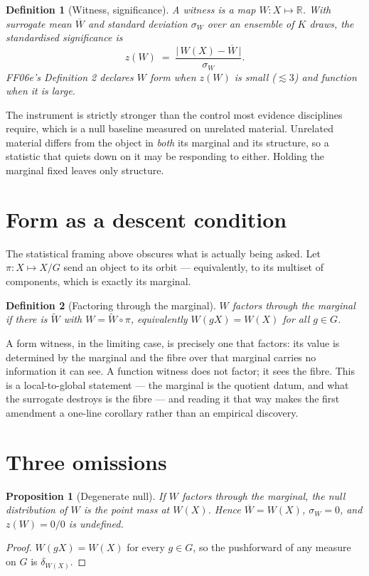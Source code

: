 \documentclass[11pt]{article}
\newtheorem{proposition}{Proposition}
\newtheorem{definition}{Definition}
\theoremstyle{remark}
\begin{document}
\begin{definition}[Witness, significance]
A \emph{witness} is a map $W\colon X \mapsto \mathbb{R}$. With surrogate mean
$\overline{W}$ and standard deviation $\sigma_W$ over an ensemble of $K$ draws, the
\emph{standardised significance} is
\[
  z(W) \;=\; \frac{\bigl|\,W(X)-\overline{W}\,\bigr|}{\sigma_W}.
\]
FF06e's Definition 2 declares $W$ \emph{form} when $z(W)$ is small ($\lesssim 3$) and
\emph{function} when it is large.
\end{definition}

The instrument is strictly stronger than the control most evidence disciplines require,
which is a null baseline measured on unrelated material. Unrelated material differs from
the object in \emph{both} its marginal and its structure, so a statistic that quiets down
on it may be responding to either. Holding the marginal fixed leaves only structure.

\section{Form as a descent condition}\label{sec:descent}

The statistical framing above obscures what is actually being asked. Let
$\pi\colon X \mapsto X/G$ send an object to its orbit --- equivalently, to its multiset
of components, which is exactly its marginal.

\begin{definition}[Factoring through the marginal]
$W$ \emph{factors through the marginal} if there is $\widetilde{W}$ with
$W = \widetilde{W}\circ\pi$, equivalently $W(gX)=W(X)$ for all $g\in G$.
\end{definition}

A form witness, in the limiting case, is precisely one that factors: its value is
determined by the marginal and the fibre over that marginal carries no information it can
see. A function witness does not factor; it sees the fibre. This is a local-to-global
statement --- the marginal is the quotient datum, and what the surrogate destroys is the
fibre --- and reading it that way makes the first amendment a one-line corollary rather
than an empirical discovery.

\section{Three omissions}\label{sec:props}

\begin{proposition}[Degenerate null]\label{prop:degenerate}
If $W$ factors through the marginal, the null distribution of $W$ is the point mass at
$W(X)$. Hence $\overline{W}=W(X)$, $\sigma_W=0$, and $z(W)=0/0$ is undefined.
\end{proposition}
\begin{proof}
$W(gX)=W(X)$ for every $g\in G$, so the pushforward of any measure on $G$ is
$\delta_{W(X)}$.
\end{proof}
\end{document}
